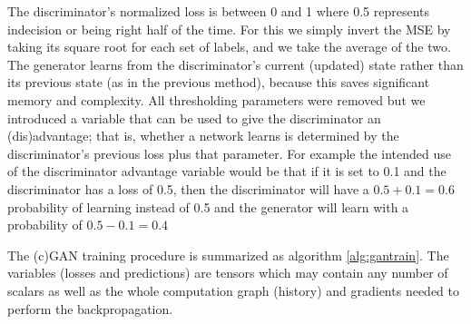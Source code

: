 The discriminator's normalized loss is between 0 and 1 where 0.5 represents indecision or being right half of the time. For this we simply invert the \ac{MSE} by taking its square root for each set of labels, and we take the average of the two. The generator learns from the discriminator's current (updated) state rather than its previous state (as in the previous method), because this saves significant memory and complexity. All thresholding parameters were removed but we introduced a variable that can be used to give the discriminator an (dis)advantage; that is, whether a network learns is determined by the discriminator's previous loss plus that parameter. For example the intended use of the discriminator advantage variable would be that if it is set to 0.1 and the discriminator has a loss of 0.5, then the discriminator will have a $0.5+0.1=0.6$ probability of learning instead of 0.5 and the generator will learn with a probability of $0.5-0.1=0.4$

The (c)GAN training procedure is summarized as algorithm \ref{alg:gantrain}. The variables (losses and predictions) are tensors which may contain any number of scalars as well as the whole computation graph (history) and gradients needed to perform the backpropagation.



